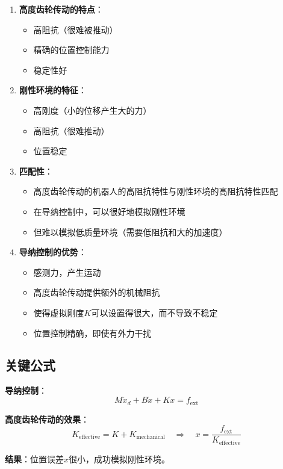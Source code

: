 \documentclass[12pt,a4paper]{article}
\begin{document}
\begin{enumerate}
\item \textbf{高度齿轮传动的特点}：
\begin{itemize}
\item 高阻抗（很难被推动）
\item 精确的位置控制能力
\item 稳定性好
\end{itemize}

\item \textbf{刚性环境的特征}：
\begin{itemize}
\item 高刚度（小的位移产生大的力）
\item 高阻抗（很难推动）
\item 位置稳定
\end{itemize}

\item \textbf{匹配性}：
\begin{itemize}
\item 高度齿轮传动的机器人的高阻抗特性与刚性环境的高阻抗特性匹配
\item 在导纳控制中，可以很好地模拟刚性环境
\item 但难以模拟低质量环境（需要低阻抗和大的加速度）
\end{itemize}

\item \textbf{导纳控制的优势}：
\begin{itemize}
\item 感测力，产生运动
\item 高度齿轮传动提供额外的机械阻抗
\item 使得虚拟刚度$K$可以设置得很大，而不导致不稳定
\item 位置控制精确，即使有外力干扰
\end{itemize}
\end{enumerate}

\subsection{关键公式}

\textbf{导纳控制}：
\begin{equation}
M\ddot{x}_d + B\dot{x} + Kx = f_{\text{ext}}
\end{equation}

\textbf{高度齿轮传动的效果}：
\begin{equation}
K_{\text{effective}} = K + K_{\text{mechanical}} \quad \Rightarrow \quad x = \frac{f_{\text{ext}}}{K_{\text{effective}}}
\end{equation}

\textbf{结果}：位置误差$x$很小，成功模拟刚性环境。
\end{document}
